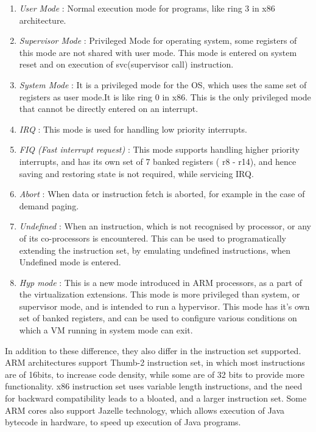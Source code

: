 \documentclass[seminar,twoside]{iitbreport}
\begin{document}
\begin{enumerate}
\item \emph{\textmd{User Mode }}: Normal execution mode for programs, like ring 3 in x86 architecture.\\
\item \emph{\textmd{Supervisor Mode}} : Privileged Mode for operating system, some registers of this mode are not shared with user mode. This mode is entered on system reset and on execution of svc(supervisor call) instruction.\\
\item \emph{\textmd{System Mode }}: It is a privileged mode for the OS, which uses the same set of registers as user mode.It is like ring 0 in x86. This is the only privileged mode that cannot be directly entered on an interrupt.
\\
\item \emph{\textmd{IRQ}} : This mode is used for handling low priority interrupts.
\\
\item \emph{\textmd{FIQ (Fast interrupt request) }} : This mode supports handling higher priority interrupts, and has its own set of 7 banked registers ( r8 - r14), and hence saving and restoring state is not required, while servicing IRQ.
\\
\item \emph{\textmd{Abort }} : When data or instruction fetch is aborted, for example in the case of demand paging.
\\
\item \emph{\textmd{Undefined}} : When an instruction, which is not recognised by processor, or any of its co-processors is encountered. This can be used to programatically extending the instruction set, by emulating undefined instructions, when Undefined mode is entered.
\\
\item \emph{\textmd{Hyp mode}} : This is a new mode introduced in ARM processors, as a part of the virtualization extensions. This mode is more privileged than system, or supervisor mode, and is intended to run a hypervisor. This mode has it's own set of banked registers, and can be used to configure various conditions on which a VM running in system mode can exit.
\\
\end{enumerate}

In addition to these difference, they also differ in the instruction set supported. ARM architectures support Thumb-2 instruction set, in which most instructions are of 16bits, to increase code density, while some are of 32 bits to provide more functionality. x86 instruction set uses variable length instructions, and the need for backward compatibility leads to a bloated, and a larger instruction set. 
Some ARM cores also support Jazelle technology, which allows execution of Java bytecode in hardware, to speed up execution of Java programs.
\\\\
\end{document}
